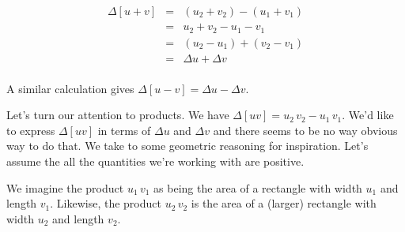 \documentclass{ximera}
\begin{document}
\[ \begin{array}{rcl}

 \Delta[u+v] & = & (u_{2} + v_{2}) - (u_{1} + v_{1})   \\
                                & = &   u_{2} + v_{2} - u_{1} - v_{1} \\
                                & = &  (u_{2} - u_{1}) + (v_{2} - v_{1}) \\
                                & = &  \Delta u + \Delta v  \\ \end{array} \]

A similar calculation gives $\Delta[u - v] = \Delta u - \Delta v$.

Let's turn our attention to products. We have $\Delta[uv] = u_{2} \, v_{2} - u_{1} \, v_{1}$.  We'd like to express $\Delta[uv]$ in terms of $\Delta u$ and $\Delta v$ and there seems to be no way obvious way to do that.  We take to some geometric reasoning for inspiration.  Let's assume the all the quantities we're working with are positive.

We imagine the product $u_{1} \, v_{1}$ as being the area of a rectangle with width $u_{1}$ and length $v_{1}$.  Likewise, the product $u_{2} \, v_{2}$ is the area of a (larger) rectangle with width $u_{2}$ and length $v_{2}$.

\begin{image}
   

\end{image}
\end{document}
